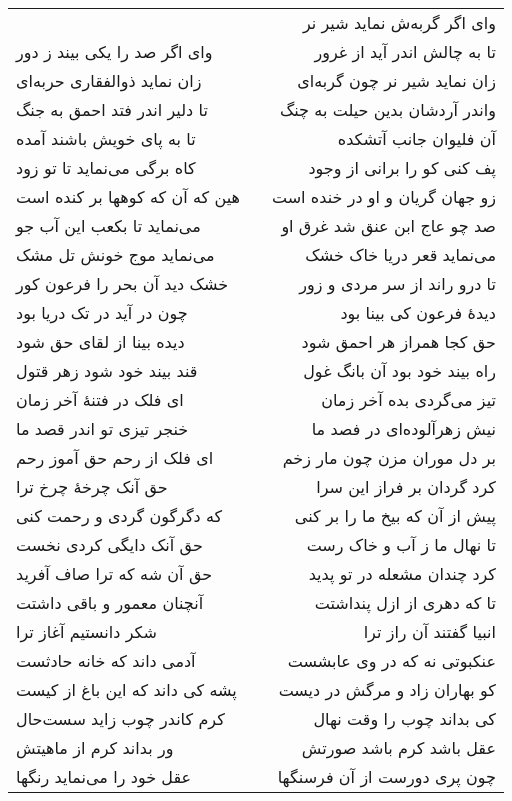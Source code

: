 \begin{center}
\begin{longtable}{l p{0.5cm} r}
&&
وای اگر گربه‌ش نماید شیر نر
\\
وای اگر صد را یکی بیند ز دور
&&
تا به چالش اندر آید از غرور
\\
زان نماید ذوالفقاری حربه‌ای
&&
زان نماید شیر نر چون گربه‌ای
\\
تا دلیر اندر فتد احمق به جنگ
&&
واندر آردشان بدین حیلت به چنگ
\\
تا به پای خویش باشند آمده
&&
آن فلیوان جانب آتشکده
\\
کاه برگی می‌نماید تا تو زود
&&
پف کنی کو را برانی از وجود
\\
هین که آن که کوهها بر کنده است
&&
زو جهان گریان و او در خنده است
\\
می‌نماید تا بکعب این آب جو
&&
صد چو عاج ابن عنق شد غرق او
\\
می‌نماید موج خونش تل مشک
&&
می‌نماید قعر دریا خاک خشک
\\
خشک دید آن بحر را فرعون کور
&&
تا درو راند از سر مردی و زور
\\
چون در آید در تک دریا بود
&&
دیدهٔ فرعون کی بینا بود
\\
دیده بینا از لقای حق شود
&&
حق کجا همراز هر احمق شود
\\
قند بیند خود شود زهر قتول
&&
راه بیند خود بود آن بانگ غول
\\
ای فلک در فتنهٔ آخر زمان
&&
تیز می‌گردی بده آخر زمان
\\
خنجر تیزی تو اندر قصد ما
&&
نیش زهرآلوده‌ای در فصد ما
\\
ای فلک از رحم حق آموز رحم
&&
بر دل موران مزن چون مار زخم
\\
حق آنک چرخهٔ چرخ ترا
&&
کرد گردان بر فراز این سرا
\\
که دگرگون گردی و رحمت کنی
&&
پیش از آن که بیخ ما را بر کنی
\\
حق آنک دایگی کردی نخست
&&
تا نهال ما ز آب و خاک رست
\\
حق آن شه که ترا صاف آفرید
&&
کرد چندان مشعله در تو پدید
\\
آنچنان معمور و باقی داشتت
&&
تا که دهری از ازل پنداشتت
\\
شکر دانستیم آغاز ترا
&&
انبیا گفتند آن راز ترا
\\
آدمی داند که خانه حادثست
&&
عنکبوتی نه که در وی عابشست
\\
پشه کی داند که این باغ از کیست
&&
کو بهاران زاد و مرگش در دیست
\\
کرم کاندر چوب زاید سست‌حال
&&
کی بداند چوب را وقت نهال
\\
ور بداند کرم از ماهیتش
&&
عقل باشد کرم باشد صورتش
\\
عقل خود را می‌نماید رنگها
&&
چون پری دورست از آن فرسنگها

\end{longtable}
\end{center}
